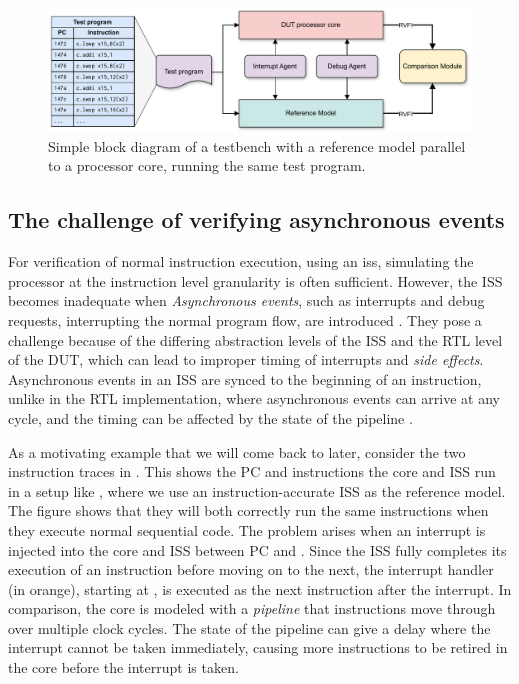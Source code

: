 \begin{figure}
    \centering
    \includegraphics[width=1.00\linewidth]{figures/ISS_Testbench.pdf}
    \caption{Simple block diagram of a testbench with a reference model parallel to a processor core, running the same test program. }
    \label{fig:testbench_block_diagram}
\end{figure}


\subsection{The challenge of verifying asynchronous events}

For verification of normal instruction execution, using an \acrfull{iss}, simulating the processor at the instruction level granularity is often sufficient. However, the ISS becomes inadequate when \textit{Asynchronous events}, such as interrupts and debug requests, interrupting the normal program flow, are introduced \cite{taylorAdvancedRISCVVerification2023}. They pose a challenge because of the differing abstraction levels of the ISS and the RTL level of the DUT, which can lead to improper timing of interrupts and \textit{side effects}. Asynchronous events in an ISS are synced to the beginning of an instruction, unlike in the RTL implementation, where asynchronous events can arrive at any cycle, and the timing can be affected by the state of the pipeline \cite{taylorAdvancedRISCVVerification2023}.

As a motivating example that we will come back to later, consider the two instruction traces in . This shows the PC and instructions the core and ISS run in a setup like , where we use an instruction-accurate ISS as the reference model. The figure shows that they will both correctly run the same instructions when they execute normal sequential code. The problem arises when an interrupt is injected into the core and ISS between PC  and . Since the ISS fully completes its execution of an instruction before moving on to the next, the interrupt handler (in orange), starting at , is executed as the next instruction after the interrupt. In comparison, the core is modeled with a \textit{pipeline} that instructions move through over multiple clock cycles. The state of the pipeline can give a delay where the interrupt cannot be taken immediately, causing more instructions to be retired in the core before the interrupt is taken. 

